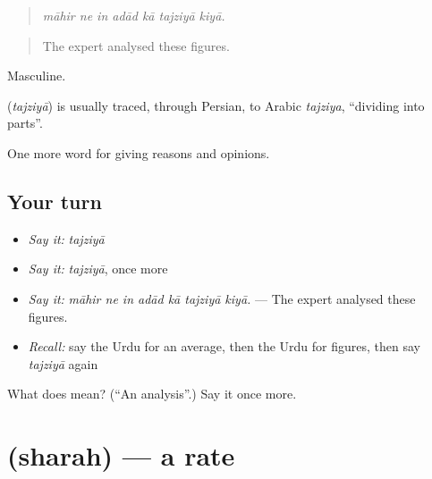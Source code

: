 \begin{quote}
      
\end{quote}

\begin{quote}
\emph{māhir ne in adād kā tajziyā kiyā.}
\end{quote}

\begin{quote}
The expert analysed these figures.
\end{quote}

Masculine.

\begin{cousinweb}
\textbf{} (\emph{tajziyā}) is usually traced, through Persian, to Arabic \emph{tajziya}, \textquotedblleft{}dividing into parts\textquotedblright{}.
\end{cousinweb}

\begin{grammarlens}[title={What you've built}]
One more word for giving reasons and opinions.
\end{grammarlens}

\subsection*{Your turn}
\begin{itemize}
\raggedright
  \item \emph{Say it:} \emph{tajziyā}
  \item \emph{Say it:} \emph{tajziyā}, once more
  \item \emph{Say it:} \emph{māhir ne in adād kā tajziyā kiyā.} — The expert analysed these figures.
  \item \emph{Recall:} say the Urdu for an average, then the Urdu for figures, then say \emph{tajziyā} again
\end{itemize}

\begin{tcolorbox}[breakable,colback=teal!4,colframe=teal!35!black,title={Before you move on}]
What does  mean? (\textquotedblleft{}An analysis\textquotedblright{}.) Say it once more.
\end{tcolorbox}
\section[\texorpdfstring{\ur{شرح} (sharah)}{شرح (sharah)}]{ (sharah) — a rate}

\label{lesson:UR-C350-sharah}



